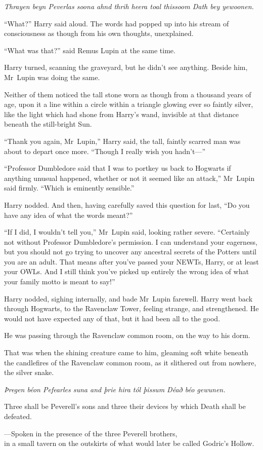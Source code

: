 \emph{Thrayen beyn Peverlas soona ahnd thrih heera toal thissoom Dath bey
yewoonen.}

“What?” Harry said aloud. The words had popped up into his stream of
consciousness as though from his own thoughts, unexplained.

“What was that?” said Remus Lupin at the same time.

Harry turned, scanning the graveyard, but he didn’t see anything. Beside him,
Mr~Lupin was doing the same.

Neither of them noticed the tall stone worn as though from a thousand years of
age, upon it a line within a circle within a triangle glowing ever so faintly
silver, like the light which had shone from Harry’s wand, invisible at that
distance beneath the still-bright Sun.

“Thank you again, Mr~Lupin,” Harry said, the tall, faintly scarred man was
about to depart once more. “Though I really wish you hadn’t—”

“Professor Dumbledore said that I was to portkey us back to Hogwarts if
anything unusual happened, whether or not it seemed like an attack,” Mr~Lupin
said firmly. “Which is eminently sensible.”

Harry nodded. And then, having carefully saved this question for last, “Do you
have any idea of what the words meant?”

“If I did, I wouldn’t tell you,” Mr~Lupin said, looking rather severe.
“Certainly not without Professor Dumbledore’s permission. I can understand your
eagerness, but you should not go trying to uncover any ancestral secrets of the
Potters until you are an adult. That means after you’ve passed your NEWTs,
Harry, or at least your OWLs. And I still think you’ve picked up entirely the
wrong idea of what your family motto is meant to say!”

Harry nodded, sighing internally, and bade Mr~Lupin farewell.
\later
Harry went back through Hogwarts, to the Ravenclaw Tower, feeling strange, and
strengthened. He would not have expected any of that, but it had been all to
the good.

He was passing through the Ravenclaw common room, on the way to his dorm.

That was when the shining creature came to him, gleaming soft white beneath the
candlefires of the Ravenclaw common room, as it slithered out from nowhere, the
silver snake.
\later
\begin{center}
\emph{Þregen béon Pefearles suna and þrie hira
tól þissum Déað béo gewunen.}

Three shall be Peverell’s sons and three their devices by which Death shall be
defeated.

—Spoken in the presence of the three Peverell brothers,\\
in a small tavern on the outskirts of what would later be called Godric’s
Hollow.
\end{center}
